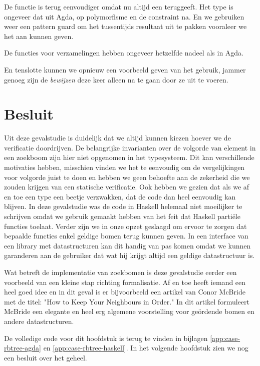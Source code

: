 De  functie is terug eenvoudiger omdat  nu altijd een
 teruggeeft. Het type is ongeveer dat uit Agda, op polymorfisme
en de  constraint na. En we gebruiken weer een pattern guard om het
tussentijds resultaat uit te pakken vooraleer we het aan  kunnen
geven.


De functies voor verzamelingen hebben ongeveer hetzelfde nadeel als in Agda.


En tenslotte kunnen we opnieuw een voorbeeld geven van het gebruik, jammer
genoeg zijn de \emph{bewijzen} deze keer alleen na te gaan door ze uit te
voeren.



\section{Besluit}

Uit deze gevalstudie is duidelijk dat we altijd kunnen kiezen hoever we de
verificatie doordrijven. De belangrijke invarianten over de volgorde van
element in een zoekboom zijn hier niet opgenomen in het typesysteem. Dit kan
verschillende motivaties hebben, misschien vinden we het te eenvoudig om de
vergelijkingen voor volgorde juist te doen en hebben we geen behoefte aan de
zekerheid die we zouden krijgen van een statische verificatie. Ook hebben we
gezien dat als we af en toe een type een beetje verzwakken, dat de code dan heel
eenvoudig kan blijven. In deze gevalstudie was de code in Haskell helemaal niet
moeilijker te schrijven omdat we gebruik gemaakt hebben van het feit dat
Haskell partiële functies toelaat. Verder zijn we in onze opzet geslaagd om
ervoor te zorgen dat bepaalde functies enkel geldige bomen terug kunnen geven.
In een interface van een library met datastructuren kan dit handig van pas
komen omdat we kunnen garanderen aan de gebruiker dat wat hij krijgt altijd een
geldige datastructuur is.

Wat betreft de implementatie van zoekbomen is deze gevalstudie eerder een
voorbeeld van een kleine stap richting formalisatie. Af en toe heeft iemand een
heel goed idee en in dit geval is er bijvoorbeeld een artikel van Conor
McBride \cite{hkynio} met de titel: "How to Keep Your Neighbours in Order."
In dit artikel formuleert McBride een elegante en heel erg algemene
voorstelling voor geördende bomen en andere datastructuren.

De volledige code voor dit hoofdstuk is terug te vinden in bijlagen
\ref{app:case-rbtree-agda} en \ref{app:case-rbtree-haskell}.
In het volgende hoofdstuk zien we nog een besluit over het geheel.
